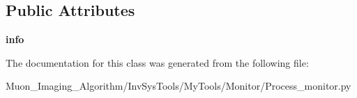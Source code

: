 \subsection*{Public Attributes}
\begin{DoxyCompactItemize}
\item 
\mbox{\label{classMIS_1_1Muon__Imaging__Algorithm_1_1InvSysTools_1_1MyTools_1_1Monitor_1_1Process__monitor_1_1__info__struct_a1caa1c7d0163d25ca49005924645ede4}} 
{\bfseries info}
\end{DoxyCompactItemize}


The documentation for this class was generated from the following file\+:\begin{DoxyCompactItemize}
\item 
Muon\+\_\+\+Imaging\+\_\+\+Algorithm/\+Inv\+Sys\+Tools/\+My\+Tools/\+Monitor/Process\+\_\+monitor.\+py\end{DoxyCompactItemize}
